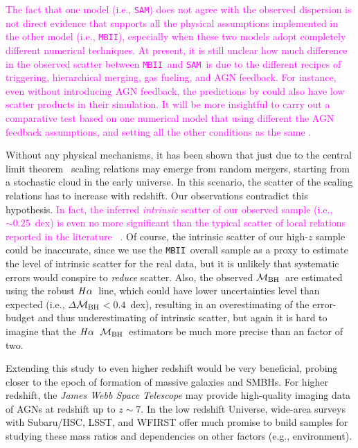 \documentclass[twocolumn,trackchanges]{aastex63}
\newcommand{\mbh}{$\mathcal M_{\rm BH}$}
\newcommand{\halpha}{${\it H}\alpha$}
\newcommand{\sam}{\texttt{SAM}}
\newcommand{\mbii}{\texttt{MBII}}
\newcommand{\pink}[1]{{ \textcolor{magenta}{#1}}}
\begin{document}
\pink{The fact that one model (i.e., \sam) does not agree with the observed dispersion is not direct evidence that supports all the physical assumptions implemented in the other model (i.e., \mbii), especially when these two models adopt completely different numerical techniques. At present, it is still unclear how much difference in the observed scatter between \mbii\ and \sam\ is due to the different recipes of triggering, hierarchical merging, gas fueling, and AGN feedback. For instance, even without introducing AGN feedback, the predictions by \citet{2017MNRAS.464.2840A} could also have low scatter products in their simulation.
It will be more insightful to carry out a comparative test based on one numerical model that using different the AGN feedback assumptions, and setting all the other conditions as the same \citep[see][as a glimpse]{Hopkins2009}.
}

Without any physical mechanisms, it has been shown that just due to the central limit theorem~\citep{Peng2007, Jahnke2011, Hirschmann2010} scaling relations may emerge from random mergers, starting from a stochastic cloud in the early universe. In this scenario, the scatter of the scaling relations has to increase with redshift. Our observations contradict this hypothesis.\pink{In fact, the inferred {\it intrinsic} scatter of our observed sample (i.e., $\sim0.25$~dex) is even no more significant than the typical scatter of local relations reported in the literature ~\citep[][i.e., $\gtrsim0.35$~dex]{Kormendy13, Gul++09, Reines2015}.} Of course, the intrinsic scatter of our high-$z$ sample could be inaccurate, since we use the \mbii\ overall sample as a proxy to estimate the level of intrinsic scatter for the real data, but it is unlikely that systematic errors would conspire to {\it reduce} scatter.
Also, the observed \mbh\ are estimated using the robust \halpha\ line, which could have lower uncertainties level than expected (i.e., $\Delta$\mbh$<0.4$~dex), resulting in an overestimating of the error-budget and thus underestimating of intrinsic scatter, but again it is hard to imagine that the \halpha\ \mbh\ estimators be much more precise than an factor of two. 

Extending this study to even higher redshift would be very beneficial, probing closer to the epoch of formation of massive galaxies and SMBHs. For higher redshift, the {\it James Webb Space Telescope} may provide high-quality imaging data of AGNs at redshift up to $z\sim7$. In the low redshift Universe, wide-area surveys with Subaru/HSC, LSST, and WFIRST offer much promise to build samples for studying these mass ratios and dependencies on other factors (e.g., environment).
\end{document}
